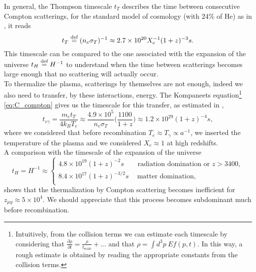 In general, the Thompson timescale $t_T$ describes the time between consecutive Compton scatterings, for the standard model of cosmology (with $24\%$ of He) as in \cite{chlubafuturestepscosmologyusing}, it reads$$t_T\stackrel{\text{def}}{=}(n_e\sigma_T)^{-1}\approx2.7\times10^{20}X_e^{-1}(1+z)^{-3}s.$$ This timescale can be compared to the one associated with the expansion of the universe $t_H\stackrel{\text{def}}{=} H^{-1}$
 to understand when the time between scatterings becomes large enough that no scattering will actually occur. \\To thermalize the plasma, scatterings by themselves are not enough, indeed we also need to transfer, by these interactions, energy. The Kompaneets equation\footnote{Intuitively, from the collision terms we can estimate each timescale by considering that $\frac{\partial\rho}{\partial t}=\frac{\rho}{t_\text{scale}}+\dots$ and that $\rho=\int d^3p\ Ef(p,t)$. In this way, a rough estimate is obtained by reading the appropriate constants from the collision terms.} \eqref{eq:C_compton} gives us the timescale for this transfer, as estimated in \cite{chlubafuturestepscosmologyusing},$$ t_{e\gamma}=\frac{m_et_T}{4k_BT_e}\approx\frac{4.9\times10^{5}}{n_e\sigma_T}\bigg(\frac{1100}{1+z}\bigg)\approx1.2\times10^{29}(1+z)^{-4}s,$$ 
where we considered that before recombination $T_e\approx T_\gamma\propto a^{-1}$, we inserted the temperature of the plasma and we considered $X_e\approx 1$ at high redshifts.\\ A comparison with the timescale of the expansion of the universe$$t_H=H^{-1}\approx\begin{cases}
    4.8\times10^{19}(1+z)^{-2}s\qquad\text{radiation domination or } z>3400,\\
    8.4\times10^{17}(1+z)^{-3/2}s\quad\ \text{matter domination} ,\\
\end{cases}$$ shows that the thermalization by Compton scattering becomes inefficient for $z_{\mu y}\approx5\times10^4$. We should appreciate that this process becomes subdominant much before recombination.

